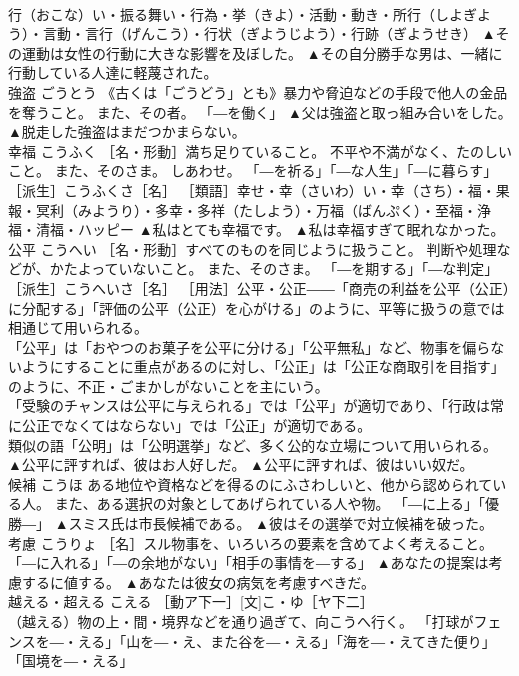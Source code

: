 \documentclass[8pt]{extreport}
\begin{document}
\begin{CJK}{UTF8}{min}
\\	行（おこな）い・振る舞い・行為・挙（きよ）・活動・動き・所行（しよぎよう）・言動・言行（げんこう）・行状（ぎようじよう）・行跡（ぎようせき）	▲その運動は女性の行動に大きな影響を及ぼした。 ▲その自分勝手な男は、一緒に行動している人達に軽蔑された。
\\	強盗	ごうとう	《古くは「ごうどう」とも》暴力や脅迫などの手段で他人の金品を奪うこと。 また、その者。 「―を働く」	▲父は強盗と取っ組み合いをした。 ▲脱走した強盗はまだつかまらない。
\\	幸福	こうふく	［名・形動］満ち足りていること。 不平や不満がなく、たのしいこと。 また、そのさま。 しあわせ。 「―を祈る」「―な人生」「―に暮らす」 ［派生］こうふくさ［名］ ［類語］幸せ・幸（さいわ）い・幸（さち）・福・果報・冥利（みようり）・多幸・多祥（たしよう）・万福（ばんぷく）・至福・浄福・清福・ハッピー	▲私はとても幸福です。 ▲私は幸福すぎて眠れなかった。
\\	公平	こうへい	［名・形動］すべてのものを同じように扱うこと。 判断や処理などが、かたよっていないこと。 また、そのさま。 「―を期する」「―な判定」 ［派生］こうへいさ［名］ ［用法］公平・公正――「商売の利益を公平（公正）に分配する」「評価の公平（公正）を心がける」のように、平等に扱うの意では相通じて用いられる。 
\\	「公平」は「おやつのお菓子を公平に分ける」「公平無私」など、物事を偏らないようにすることに重点があるのに対し、「公正」は「公正な商取引を目指す」のように、不正・ごまかしがないことを主にいう。 
\\	「受験のチャンスは公平に与えられる」では「公平」が適切であり、「行政は常に公正でなくてはならない」では「公正」が適切である。 
\\	類似の語「公明」は「公明選挙」など、多く公的な立場について用いられる。	▲公平に評すれば、彼はお人好しだ。 ▲公平に評すれば、彼はいい奴だ。
\\	候補	こうほ	ある地位や資格などを得るのにふさわしいと、他から認められている人。 また、ある選択の対象としてあげられている人や物。 「―に上る」「優勝―」	▲スミス氏は市長候補である。 ▲彼はその選挙で対立候補を破った。
\\	考慮	こうりょ	［名］スル物事を、いろいろの要素を含めてよく考えること。 「―に入れる」「―の余地がない」「相手の事情を―する」	▲あなたの提案は考慮するに値する。 ▲あなたは彼女の病気を考慮すべきだ。
\\	越える・超える	こえる	［動ア下一］[文]こ・ゆ［ヤ下二］ 
\\	（越える）物の上・間・境界などを通り過ぎて、向こうへ行く。 「打球がフェンスを―・える」「山を―・え、また谷を―・える」「海を―・えてきた便り」「国境を―・える」　 

\end{CJK}
\end{document}
